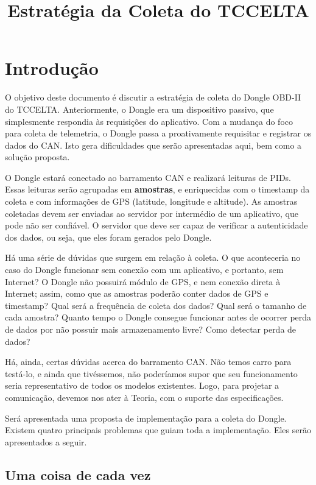 \documentclass[12pt]{article}
\title{Estratégia da Coleta do TCCELTA}
\begin{document}
\maketitle

\section{Introdução}

O objetivo deste documento é discutir a estratégia de coleta do Dongle OBD-II do TCCELTA. Anteriormente, o Dongle era um dispositivo passivo, que simplesmente respondia às requisições do aplicativo. Com a mudança do foco para coleta de telemetria, o Dongle passa a proativamente requisitar e registrar os dados do CAN. Isto gera dificuldades que serão apresentadas aqui, bem como a solução proposta.



O Dongle estará conectado ao barramento CAN e realizará leituras de PIDs. Essas leituras serão agrupadas em \textbf{amostras}, e enriquecidas com o timestamp da coleta e com informações de GPS (latitude, longitude e altitude). As amostras coletadas devem ser enviadas ao servidor por intermédio de um aplicativo, que pode não ser confiável. O servidor que deve ser capaz de verificar a autenticidade dos dados, ou seja, que eles foram gerados pelo Dongle.

Há uma série de dúvidas que surgem em relação à coleta. O que aconteceria no caso do Dongle funcionar sem conexão com um aplicativo, e portanto, sem Internet? O Dongle não possuirá módulo de GPS, e nem conexão direta à Internet; assim, como que as amostras poderão conter dados de GPS e timestamp? Qual será a frequência de coleta dos dados? Qual será o tamanho de cada amostra? Quanto tempo o Dongle consegue funcionar antes de ocorrer perda de dados por não possuir mais armazenamento livre? Como detectar perda de dados?

Há, ainda, certas dúvidas acerca do barramento CAN. Não temos carro para testá-lo, e ainda que tivéssemos, não poderíamos supor que seu funcionamento seria representativo de todos os modelos existentes. Logo, para projetar a comunicação, devemos nos ater à Teoria, com o suporte das especificações.

Será apresentada uma proposta de implementação para a coleta do Dongle. Existem quatro principais problemas que guiam toda a implementação. Eles serão apresentados a seguir.

\subsection{Uma coisa de cada vez} \label{umacoisadecadavez}
\end{document}
